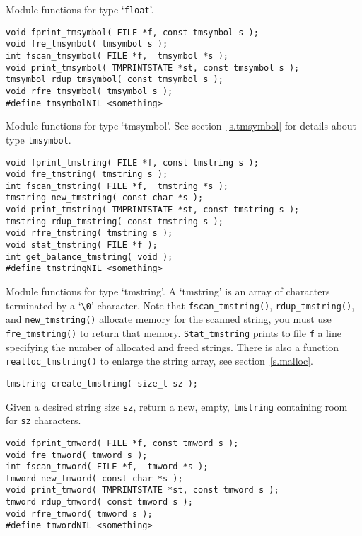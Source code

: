 \begin{desc}
Module functions for type `{\tt float}'.
\end{desc}
\begin{verbatim}
void fprint_tmsymbol( FILE *f, const tmsymbol s );
void fre_tmsymbol( tmsymbol s );
int fscan_tmsymbol( FILE *f,  tmsymbol *s );
void print_tmsymbol( TMPRINTSTATE *st, const tmsymbol s );
tmsymbol rdup_tmsymbol( const tmsymbol s );
void rfre_tmsymbol( tmsymbol s );
#define tmsymbolNIL <something>
\end{verbatim}
\begin{desc}
Module functions for type `tmsymbol'.
See section~\ref{s.tmsymbol} for details about type \verb"tmsymbol".
\end{desc}
\begin{verbatim}
void fprint_tmstring( FILE *f, const tmstring s );
void fre_tmstring( tmstring s );
int fscan_tmstring( FILE *f,  tmstring *s );
tmstring new_tmstring( const char *s );
void print_tmstring( TMPRINTSTATE *st, const tmstring s );
tmstring rdup_tmstring( const tmstring s );
void rfre_tmstring( tmstring s );
void stat_tmstring( FILE *f );
int get_balance_tmstring( void );
#define tmstringNIL <something>
\end{verbatim}
\begin{desc}
Module functions for type `tmstring'.
A `tmstring' is an array of characters terminated by a `\verb+\0+' character.
Note that {\tt fscan\_tmstring()}, {\tt rdup\_tmstring()},
and {\tt new\_tmstring()} allocate memory for the scanned string,
you must use {\tt fre\_tmstring()} to return that memory.
{\tt Stat\_tmstring} prints to file {\tt f} a line specifying the number of
allocated and freed strings.
There is also a function \verb+realloc_tmstring()+ to enlarge the
string array,
see section~\ref{s.malloc}.
\end{desc}
\begin{verbatim}
tmstring create_tmstring( size_t sz );
\end{verbatim}
\begin{desc}
Given a desired string size \verb'sz', return a new, empty, {\tt tmstring}
containing room for \verb'sz' characters.
\end{desc}
\begin{verbatim}
void fprint_tmword( FILE *f, const tmword s );
void fre_tmword( tmword s );
int fscan_tmword( FILE *f,  tmword *s );
tmword new_tmword( const char *s );
void print_tmword( TMPRINTSTATE *st, const tmword s );
tmword rdup_tmword( const tmword s );
void rfre_tmword( tmword s );
#define tmwordNIL <something>
\end{verbatim}
